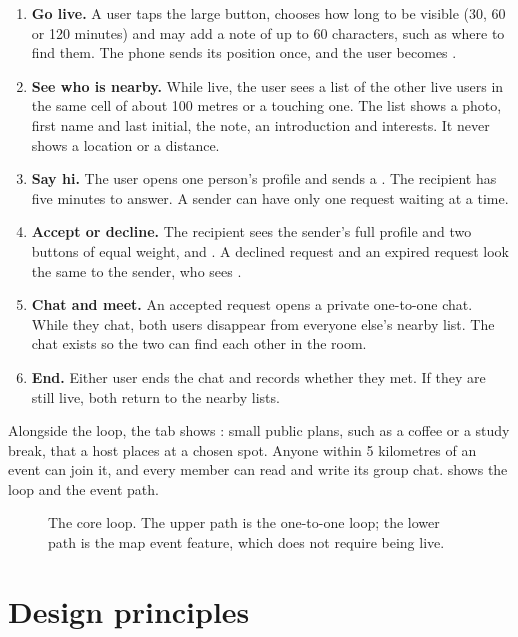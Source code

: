 \begin{enumerate}
  \item \textbf{Go live.} A user taps the large  button, chooses how long to be visible (30, 60 or
    120 minutes) and may add a note of up to 60 characters, such as where to find them. The phone sends
    its position once, and the user becomes .
  \item \textbf{See who is nearby.} While live, the user sees a list of the other live users in the same
    cell of about 100 metres or a touching one. The list shows a photo, first name and last initial, the note, an introduction and
    interests. It never shows a location or a distance.
  \item \textbf{Say hi.} The user opens one person's profile and sends a . The
    recipient has five minutes to answer. A sender can have only one request waiting at a time.
  \item \textbf{Accept or decline.} The recipient sees the sender's full profile and two buttons of
    equal weight,  and . A declined request and an expired request look the same
    to the sender, who sees .
  \item \textbf{Chat and meet.} An accepted request opens a private one-to-one chat. While they chat, both
    users disappear from everyone else's nearby list. The chat exists so the two can find each other in
    the room.
  \item \textbf{End.} Either user ends the chat and records whether they met. If they are still live, both
    return to the nearby lists.
\end{enumerate}

Alongside the loop, the  tab shows : small public plans, such as a coffee or a study
break, that a host places at a chosen spot. Anyone within 5 kilometres of an event can join it, and every
member can read and write its group chat.  shows the loop and the event path.

\begin{figure}[t]
  \centering
  
  \caption{The core loop. The upper path is the one-to-one loop; the lower path is the map event feature,
    which does not require being live.}
  \label{fig:core-loop}
\end{figure}

\section{Design principles}

